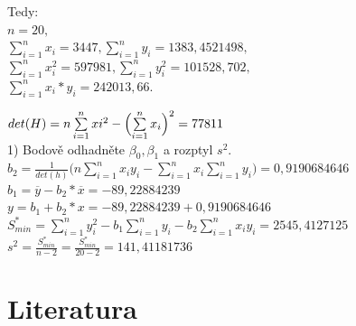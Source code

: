 \documentclass[11pt,a4paper]{article}
\newcommand\ddfrac[2]{\frac{\displaystyle #1}{\displaystyle #2}}
\begin{document}
Tedy: \\

$ n = 20,$ \\

$\sum\limits_{i=1}^n x_i = 3447, \sum\limits_{i=1}^n y_i = 1383,4521498, $ \\

$\sum\limits_{i=1}^{n} x_{i}^2 = 597981, \sum\limits_{i=1}^n y_{i}^2 = 101528,702, $ \\

$\sum\limits_{i=1}^n x_i * y_i = 242013,66. $

\newpage

$ det(H) = n \sum\limits_{i=1}^{n} x{i}^2 - \Bigl( \sum\limits_{i=1}^{n} x_i \Bigr)^2 = 77811$ \\

1) Bodově odhadněte $ \beta_0, \beta_1 $ a rozptyl $ s^2 $. \\

$ b_2 = \ddfrac{1}{det(h)} \biggl( n \sum\limits_{i=1}^{n} x_i y_i - \sum\limits_{i=1}^{n} x_i \sum\limits_{i=1}^{n} y_i \biggr) = 0,9190684646 $ \\

$ b_1 = \overline{y} - b_2 * \overline{x} = -89,22884239 $ \\

$ y = b_1 + b_2 * x = -89,22884239 + 0,9190684646 $ \\

$ S_{min}^{*} = \sum\limits_{i=1}^{n} y_{i}^2 - b_1 \sum\limits_{i=1}^n y_i - b_2 \sum\limits_{i=1}^n x_i y_i = 2545,4127125 $ \\

$ s^2 = \ddfrac{S_{min}^{*}}{n - 2} = \ddfrac{S_{min}^{*}}{20 - 2} = 141,41181736 $ \\
\vspace{0,7cm}



\section{Literatura}

\begin{flushleft}
    
\end{flushleft}
\end{document}
